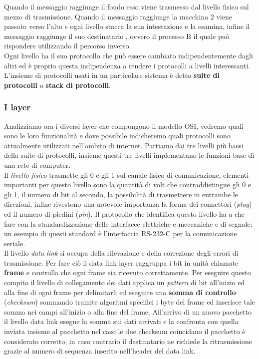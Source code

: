 Quando il messaggio raggiunge il fondo esso viene trasmesso dal livello fisico sul mezzo di trasmissione. Quando il messaggio raggiunge la macchina 2 viene passato verso l'alto e ogni livello stacca la sua intestazione e la esamina, infine il messaggio raggiunge il suo destinatario , ovvero il processo B il quale può rispondere utilizzando il percorso inverso.\\
Ogni livello ha il suo protocollo che può essere cambiato indipendentemente dagli altri ed è proprio questa indipendenza a rendere i protocolli a livelli interessanti.\\
L'insieme di protocolli usati in un particolare sistema è detto \textbf{suite di protocolli} o \textbf{stack di protocolli}.
\subsubsection{I layer}
Analizziamo ora i diversi layer che compongono il modello OSI, vedremo quali sono le loro funzionalità e dove possibile indicheremo quali protocolli sono attualmente utilizzati nell'ambito di internet.
Partiamo dai tre livelli più bassi della suite di protocolli, insieme questi tre livelli implementano le funzioni base di una rete di computer.\\
Il \emph{livello fisico} trasmette gli 0 e gli 1 sul canale fisico di comunicazione, elementi importanti per questo livello sono la quantità di volt che contraddistingue gli 0 e gli 1, il numero di bit al secondo, la possibilità di trasmettere in entrambe le direzioni, infine rivestono una notevole importanza la forma dei connettori (\emph{plug}) ed il numero di piedini (\emph{pin}). Il protocollo che identifica questo livello ha a che fare con la standardizzazione delle interfacce elettriche e meccaniche e di segnale; un esempio di questi standard è l'interfaccia RS-232-C per la comunicazione seriale.\\
Il livello \emph{data link} si occupa della rilevazione e della correzione degli errori di trasmissione. Per fare ciò il data link layer raggruppa i bit in unità chiamate \textbf{frame} e controlla che ogni frame sia ricevuto correttamente. Per eseguire questo compito il livello di collegamento dei dati applica un \emph{pattern} di bit all'inizio ed alla fine di ogni frame per delimitarli ed eseguire una \textbf{somma di controllo} (\emph{checksum}) sommando tramite algoritmi specifici i byte del frame ed inserisce tale somma nei campi all'inizio o alla fine del frame.
All'arrivo di un nuovo pacchetto il livello data link esegue la somma sui dati arrivati e la confronta con quella inviata insieme al pacchetto nel caso le due checksum coincidano il pacchetto è considerato corretto, in caso contrario il destinatario ne richiede la ritrasmissione grazie al numero di sequenza inserito nell'header del data link.\\
